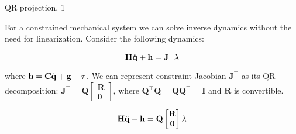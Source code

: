 \documentclass{beamer}
\begin{document}
\begin{frame}{QR projection, 1}
	\begin{flushleft}
		
		For a constrained mechanical system we can solve inverse dynamics without the need for linearization. Consider the following dynamics:
		
		\begin{equation}
			\mathbf{H}\ddot{\mathbf{q}} + \mathbf{h} = \mathbf{J}^\top \lambda
		\end{equation}
		
		where $\mathbf{h} =  \mathbf{C}\dot{\mathbf{q}} + \mathbf{g} - \tau$. We can represent constraint Jacobian $\mathbf{J}^\top$ as its QR decomposition: $\mathbf{J}^\top = \mathbf{Q} \begin{bmatrix} \mathbf{R} \\ \mathbf{0}  \end{bmatrix}$, where $\mathbf{Q}^\top \mathbf{Q} = \mathbf{Q} \mathbf{Q}^\top = \mathbf{I}$ and $\mathbf{R}$ is convertible.
		
		\begin{equation}
			\mathbf{H}\ddot{\mathbf{q}} + \mathbf{h} = \mathbf{Q} \begin{bmatrix} \mathbf{R} \\ \mathbf{0}  \end{bmatrix} \lambda
		\end{equation}
		
		
	\end{flushleft}
\end{frame}
\end{document}
